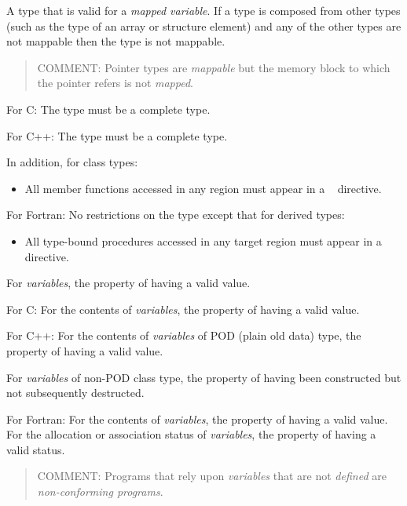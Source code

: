 \glossarydefstart
A type that is valid for a \emph{mapped variable}. If a type is composed from other types
(such as the type of an array or structure element) and any of the other types are
not mappable then the type is not mappable.

\begin{quote}
COMMENT: Pointer types are \emph{mappable} but the memory block to which the pointer refers is not \emph{mapped}.
\end{quote}

For C:
\nopagebreak
The type must be a complete type.

For C++:
\nopagebreak
The type must be a complete type.

In addition, for class types:
\begin{itemize}
\item All member functions accessed in any  region must appear in a
~ directive.
\end{itemize}

For Fortran:
\nopagebreak
No restrictions on the type except that for derived types:

\begin{itemize}
\item All type-bound procedures accessed in any target region must appear in a ~ directive.
\end{itemize}
\glossarydefend

\glossarydefstart
For \emph{variables}, the property of having a valid value.

For C:
\nopagebreak
For the contents of \emph{variables}, the property of having a valid value.

For C++:
\nopagebreak
For the contents of \emph{variables} of POD (plain old data) type, the property of having
a valid value.

For \emph{variables} of non-POD class type, the property of having been constructed but
not subsequently destructed.

For Fortran:
\nopagebreak
For the contents of \emph{variables}, the property of having a valid value. For the
allocation or association status of \emph{variables}, the property of having a valid status.

\begin{quote}
COMMENT: Programs that rely upon \emph{variables} that are not \emph{defined} are \emph{non-conforming programs}.
\end{quote}
\glossarydefend

